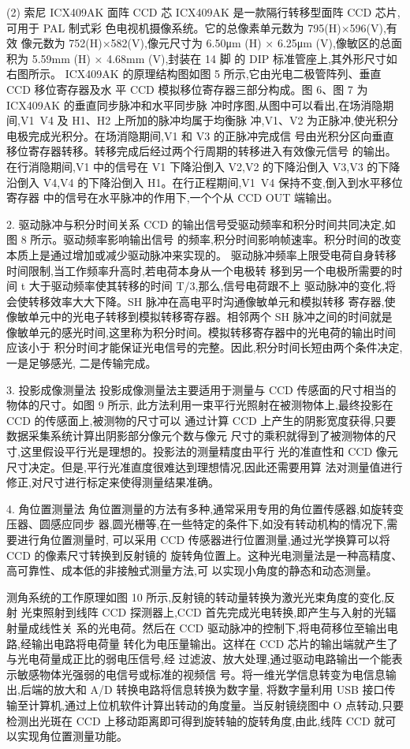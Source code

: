 \documentclass{ctexart}
\begin{document}
(2) 索尼 ICX409AK 面阵 CCD 芯
ICX409AK 是一款隔行转移型面阵 CCD 芯片,可用于 PAL 制式彩
色电视机摄像系统。它的总像素单元数为 795(H)×596(V),有效
像元数为 752(H)×582(V),像元尺寸为 6.50μm (H) × 6.25μm
(V),像敏区的总面积为 5.59mm (H) × 4.68mm (V),封装在 14 脚
的 DIP 标准管座上,其外形尺寸如右图所示。
ICX409AK 的原理结构图如图 5 所示,它由光电二极管阵列、垂直 CCD 移位寄存器及水
平 CCD 模拟移位寄存器三部分构成。图 6、图 7 为 ICX409AK 的垂直同步脉冲和水平同步脉
冲时序图,从图中可以看出,在场消隐期间,V1~V4 及 H1、H2 上所加的脉冲均属于均衡脉
冲,V1、V2 为正脉冲,使光积分电极完成光积分。在场消隐期间,V1 和 V3 的正脉冲完成信
号由光积分区向垂直移位寄存器转移。转移完成后经过两个行周期的转移进入有效像元信号
的输出。在行消隐期间,V1 中的信号在 V1 下降沿倒入 V2,V2 的下降沿倒入 V3,V3 的下降
沿倒入 V4,V4 的下降沿倒入 H1。在行正程期间,V1~V4 保持不变,倒入到水平移位寄存器
中的信号在水平脉冲的作用下,一个个从 CCD OUT 端输出。

2. 驱动脉冲与积分时间关系
CCD 的输出信号受驱动频率和积分时间共同决定,如图 8 所示。驱动频率影响输出信号
的频率,积分时间影响帧速率。积分时间的改变本质上是通过增加或减少驱动脉冲来实现的。
驱动脉冲频率上限受电荷自身转移时间限制,当工作频率升高时,若电荷本身从一个电极转
移到另一个电极所需要的时间 t 大于驱动频率使其转移的时间 T/3,那么,信号电荷跟不上
驱动脉冲的变化,将会使转移效率大大下降。SH 脉冲在高电平时沟通像敏单元和模拟转移
寄存器,使像敏单元中的光电子转移到模拟转移寄存器。相邻两个 SH 脉冲之间的时间就是
像敏单元的感光时间,这里称为积分时间。模拟转移寄存器中的光电荷的输出时间应该小于
积分时间才能保证光电信号的完整。因此,积分时间长短由两个条件决定,一是足够感光,
二是传输完成。

3. 投影成像测量法
投影成像测量法主要适用于测量与 CCD 传感面的尺寸相当的物体的尺寸。如图 9 所示,
此方法利用一束平行光照射在被测物体上,最终投影在 CCD 的传感面上,被测物的尺寸可以
通过计算 CCD 上产生的阴影宽度获得,只要数据采集系统计算出阴影部分像元个数与像元
尺寸的乘积就得到了被测物体的尺寸,这里假设平行光是理想的。投影法的测量精度由平行
光的准直性和 CCD 像元尺寸决定。但是,平行光准直度很难达到理想情况,因此还需要用算
法对测量值进行修正,对尺寸进行标定来使得测量结果准确。

4. 角位置测量法
角位置测量的方法有多种,通常采用专用的角位置传感器,如旋转变压器、圆感应同步
器,圆光栅等,在一些特定的条件下,如没有转动机构的情况下,需要进行角位置测量时,
可以采用 CCD 传感器进行位置测量,通过光学换算可以将 CCD 的像素尺寸转换到反射镜的
旋转角位置上。这种光电测量法是一种高精度、高可靠性、成本低的非接触式测量方法,可
以实现小角度的静态和动态测量。

测角系统的工作原理如图 10 所示,反射镜的转动量转换为激光光束角度的变化,反射
光束照射到线阵 CCD 探测器上,CCD 首先完成光电转换,即产生与入射的光辐射量成线性关
系的光电荷。然后在 CCD 驱动脉冲的控制下,将电荷移位至输出电路,经输出电路将电荷量
转化为电压量输出。这样在 CCD 芯片的输出端就产生了与光电荷量成正比的弱电压信号,经
过滤波、放大处理,通过驱动电路输出一个能表示敏感物体光强弱的电信号或标准的视频信
号。将一维光学信息转变为电信息输出,后端的放大和 A/D 转换电路将信息转换为数字量,
将数字量利用 USB 接口传输至计算机,通过上位机软件计算出转动的角度量。当反射镜绕图中 O 点转动,只要检测出光斑在 CCD 上移动距离即可得到旋转轴的旋转角度,由此,线阵
CCD 就可以实现角位置测量功能。
\end{document}
